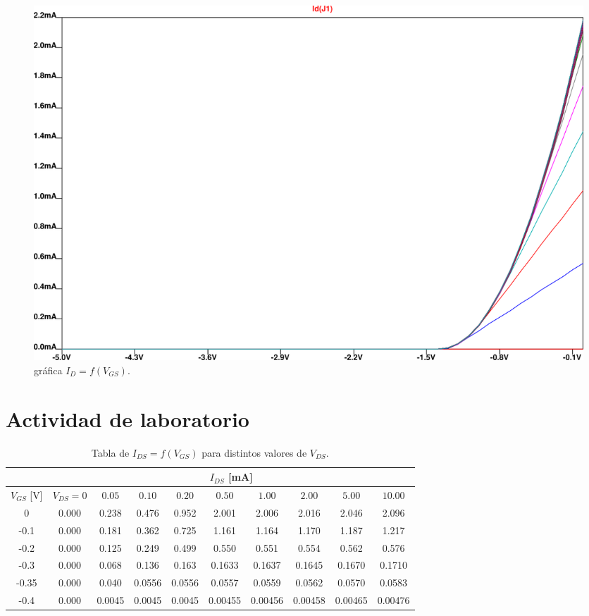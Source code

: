 \documentclass[chaptersright]{informeutn}
\begin{document}
\begin{figure}[ht!]
    \centering
    \includegraphics[width=0.9\linewidth]{pictures/graf-curva-trans-universal.png}
    \caption{gráfica $I_D = f(V_{GS})$.}
\end{figure}

\section{Actividad de laboratorio}

\begin{table}[h!]
    \centering
    \small
    \begin{tabular}{|c| ccccccccc|}
        \hline
        & \multicolumn{9}{c|}{$I_{DS}$ [mA]} \\
        \hline
        $V_{GS}$ [V] & $V_{DS}=0$ & $0.05$ & $0.10$ & $0.20$ & $0.50$ & $1.00$ & $2.00$ & $5.00$ & $10.00$ \\
        \hline
        0     & 0.000  & 0.238  & 0.476  & 0.952  & 2.001  & 2.006  & 2.016  & 2.046  & 2.096  \\
        -0.1  & 0.000  & 0.181  & 0.362  & 0.725  & 1.161  & 1.164  & 1.170  & 1.187  & 1.217  \\
        -0.2  & 0.000  & 0.125  & 0.249  & 0.499  & 0.550  & 0.551  & 0.554  & 0.562  & 0.576  \\
        -0.3  & 0.000  & 0.068  & 0.136  & 0.163  & 0.1633 & 0.1637 & 0.1645 & 0.1670 & 0.1710 \\
        -0.35 & 0.000  & 0.040  & 0.0556 & 0.0556 & 0.0557 & 0.0559 & 0.0562 & 0.0570 & 0.0583 \\
        -0.4  & 0.000  & 0.0045 & 0.0045 & 0.0045 & 0.00455& 0.00456& 0.00458& 0.00465& 0.00476 \\
        \hline
    \end{tabular}
    \caption{Tabla de $I_{DS} = f(V_{GS})$ para distintos valores de $V_{DS}$.}
\end{table}
\end{document}
